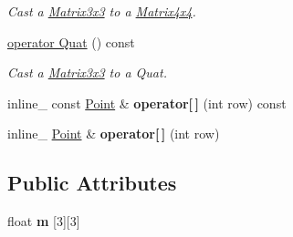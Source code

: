 \begin{DoxyCompactItemize}
\begin{DoxyCompactList}\small\item\em Cast a \hyperlink{classMatrix3x3}{Matrix3x3} to a \hyperlink{classMatrix4x4}{Matrix4x4}. \end{DoxyCompactList}\item 
\hyperlink{classMatrix3x3_aa3ecbe209786625479d28a7c34e5ed6f}{operator Quat} () const \hypertarget{classMatrix3x3_aa3ecbe209786625479d28a7c34e5ed6f}{}\label{classMatrix3x3_aa3ecbe209786625479d28a7c34e5ed6f}

\begin{DoxyCompactList}\small\item\em Cast a \hyperlink{classMatrix3x3}{Matrix3x3} to a Quat. \end{DoxyCompactList}\item 
inline\+\_\+ const \hyperlink{classPoint}{Point} \& {\bfseries operator\mbox{[}$\,$\mbox{]}} (int row) const \hypertarget{classMatrix3x3_a6acb17060e5f9fb57103abaf2e08f3cc}{}\label{classMatrix3x3_a6acb17060e5f9fb57103abaf2e08f3cc}

\item 
inline\+\_\+ \hyperlink{classPoint}{Point} \& {\bfseries operator\mbox{[}$\,$\mbox{]}} (int row)\hypertarget{classMatrix3x3_a1b1b2ce1c019cdd3b9e286ff75550751}{}\label{classMatrix3x3_a1b1b2ce1c019cdd3b9e286ff75550751}

\end{DoxyCompactItemize}
\subsection*{Public Attributes}
\begin{DoxyCompactItemize}
\item 
float {\bfseries m} \mbox{[}3\mbox{]}\mbox{[}3\mbox{]}\hypertarget{classMatrix3x3_a909d707fd0c26b98f816c395f9530b49}{}\label{classMatrix3x3_a909d707fd0c26b98f816c395f9530b49}

\end{DoxyCompactItemize}
